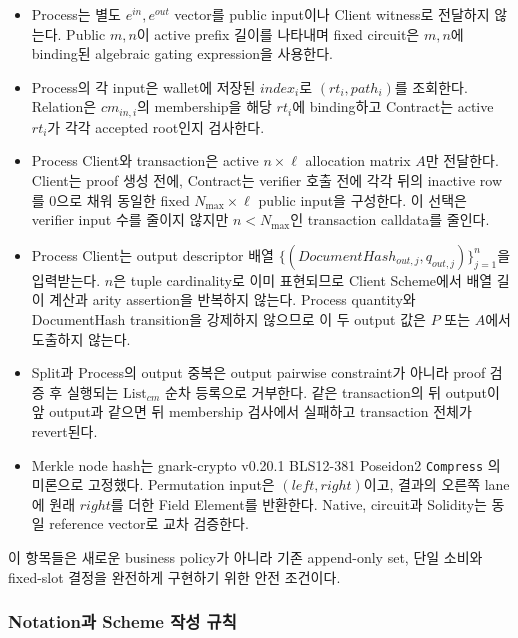 \documentclass[11pt]{extarticle}
\newcommand{\List}[1]{\mathrm{List}_{#1}}
\begin{document}
\begin{itemize}
        비교하고 fixed verifier statement를 trailing zero로 padding한다.
  \item Process는 별도 $e^{in},e^{out}$ vector를 public input이나 Client witness로
        전달하지 않는다. Public $m,n$이 active prefix 길이를 나타내며 fixed circuit은
        $m,n$에 binding된 algebraic gating expression을 사용한다.
  \item Process의 각 input은 wallet에 저장된 $index_i$로 $(rt_i,path_i)$를 조회한다.
        Relation은 $cm_{in,i}$의 membership을 해당 $rt_i$에 binding하고 Contract는 active
        $rt_i$가 각각 accepted root인지 검사한다.
  \item Process Client와 transaction은 active $n\times\ell$ allocation matrix $A$만
        전달한다. Client는 proof 생성 전에, Contract는 verifier 호출 전에 각각 뒤의
        inactive row를 0으로 채워 동일한 fixed $N_{\max}\times\ell$ public input을 구성한다.
        이 선택은 verifier input 수를 줄이지 않지만 $n<N_{\max}$인 transaction calldata를 줄인다.
  \item Process Client는 output descriptor 배열
        $\{(\mathit{DocumentHash}_{out,j},q_{out,j})\}_{j=1}^{n}$을 입력받는다. $n$은 tuple
        cardinality로 이미 표현되므로 Client Scheme에서 배열 길이 계산과 arity assertion을
        반복하지 않는다. Process quantity와 DocumentHash transition을 강제하지 않으므로 이 두
        output 값은 $P$ 또는 $A$에서 도출하지 않는다.
  \item Split과 Process의 output 중복은 output pairwise constraint가 아니라
        proof 검증 후 실행되는 $\List{cm}$ 순차 등록으로 거부한다. 같은 transaction의
        뒤 output이 앞 output과 같으면 뒤 membership 검사에서 실패하고 transaction
        전체가 revert된다.
  \item Merkle node hash는 gnark-crypto v0.20.1 BLS12-381 Poseidon2
        \texttt{Compress} 의미론으로 고정했다. Permutation input은 $(left,right)$이고,
        결과의 오른쪽 lane에 원래 $right$를 더한 Field Element를 반환한다. Native,
        circuit과 Solidity는 동일 reference vector로 교차 검증한다.
\end{itemize}

이 항목들은 새로운 business policy가 아니라 기존 append-only set, 단일 소비와
fixed-slot 결정을 완전하게 구현하기 위한 안전 조건이다.

\subsubsection{Notation과 Scheme 작성 규칙}
\end{document}
